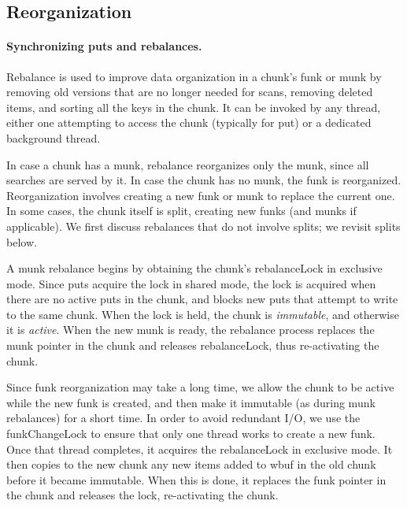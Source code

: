 \subsection{Reorganization}
\label{ssec:rebalance}

\paragraph{Synchronizing puts and rebalances.}

Rebalance is used to improve data organization in a chunk's funk or munk by removing old versions that are no longer needed for scans, 
removing deleted items, and sorting all the keys in the chunk. 
It can be invoked by any thread, either one attempting to access the chunk (typically for put) or a dedicated background thread.

In case a chunk has a munk, rebalance reorganizes only  the munk, since all searches are served by it. In case the chunk has no munk, the funk is reorganized. Reorganization involves creating a new funk or munk 
to replace the  current one.  In some cases, the chunk itself is split, creating new funks (and munks if applicable). We first discuss 
rebalances that do not involve splits; we revisit splits below.

A munk rebalance begins by obtaining the chunk's rebalanceLock in exclusive mode. Since puts acquire the lock in shared mode,
the lock is acquired when there are no active puts in the chunk, and blocks new puts that attempt to write to the same chunk. 
When the lock is held, the chunk is \emph{immutable}, and otherwise it is \emph{active}. 
When the new munk is ready, the rebalance process replaces the munk pointer in the chunk and releases rebalanceLock, thus 
re-activating the chunk.

Since funk reorganization may take a long time, we allow the chunk to be active while the new funk is created,
and then make it immutable (as during munk rebalances) for a short time. In order to avoid redundant I/O, 
we use the funkChangeLock to ensure that only one thread works to create a new funk.  Once that thread
completes, it acquires the rebalanceLock in exclusive mode.
It then copies to the new chunk any new items added to wbuf in the old chunk before it became immutable. 
When this is done, it replaces the funk pointer in the chunk and releases the lock, re-activating the chunk.

